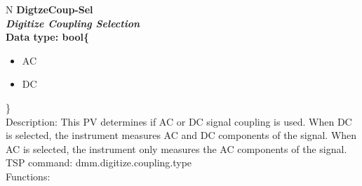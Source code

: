 \documentclass[openany]{article}
\begin{document}
		\begin{tabular}{N}
			\hline
			\bfseries DigtzeCoup-Sel\label{pv:digtzecoup-sel} \\ \hline
			\emph{Digitize Coupling Selection} \\
			Data type: bool\{\begin{itemize}[noitemsep]
				\small
				\item[] AC
				\item[] DC
			\end{itemize}\} \\
			Description: This PV determines if AC or DC signal coupling is used. When DC is selected, the instrument measures AC and DC components of the signal. When AC is selected, the instrument only measures the AC components of the signal. \\
			TSP command: dmm.digitize.coupling.type \\
			Functions: \\
			\arrayrulecolor{\FuncTableBorderColor}

		\end{tabular}
\end{document}
